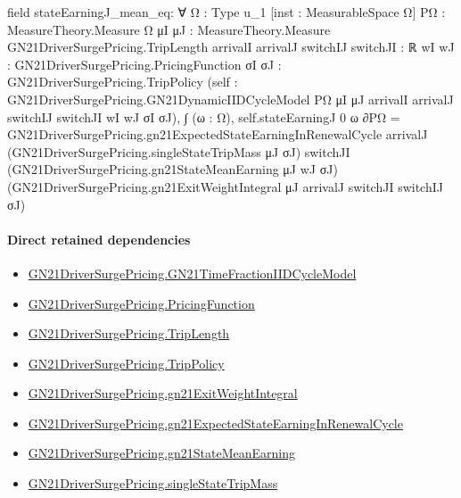 \documentclass[10pt]{article}
\begin{document}
\begin{ReviewVerbatim}
field stateEarningJ_mean_eq:
∀ {Ω : Type u_1} [inst : MeasurableSpace Ω] {PΩ : MeasureTheory.Measure Ω}
  {μI μJ : MeasureTheory.Measure GN21DriverSurgePricing.TripLength} {arrivalI arrivalJ switchIJ switchJI : ℝ}
  {wI wJ : GN21DriverSurgePricing.PricingFunction} {σI σJ : GN21DriverSurgePricing.TripPolicy}
  (self : GN21DriverSurgePricing.GN21DynamicIIDCycleModel PΩ μI μJ arrivalI arrivalJ switchIJ switchJI wI wJ σI σJ),
  ∫ (ω : Ω), self.stateEarningJ 0 ω ∂PΩ =
    GN21DriverSurgePricing.gn21ExpectedStateEarningInRenewalCycle arrivalJ
      (GN21DriverSurgePricing.singleStateTripMass μJ σJ) switchJI (GN21DriverSurgePricing.gn21StateMeanEarning μJ wJ σJ)
      (GN21DriverSurgePricing.gn21ExitWeightIntegral μJ arrivalJ switchJI switchIJ σJ)
\end{ReviewVerbatim}

\paragraph{Direct retained dependencies}
\begin{itemize}\raggedright
\item \hyperlink{paper-prerequisite-be12410503a9b0bd}{GN21\allowbreak{}Driver\allowbreak{}Surge\allowbreak{}Pricing.\allowbreak{}GN21\allowbreak{}Time\allowbreak{}Fraction\allowbreak{}IID\allowbreak{}Cycle\allowbreak{}Model}
\item \hyperlink{governing-declaration-9ab0ab344da5df05}{GN21\allowbreak{}Driver\allowbreak{}Surge\allowbreak{}Pricing.\allowbreak{}Pricing\allowbreak{}Function}
\item \hyperlink{governing-declaration-a616c143f22cf2bc}{GN21\allowbreak{}Driver\allowbreak{}Surge\allowbreak{}Pricing.\allowbreak{}Trip\allowbreak{}Length}
\item \hyperlink{governing-declaration-4312ad4cb899871f}{GN21\allowbreak{}Driver\allowbreak{}Surge\allowbreak{}Pricing.\allowbreak{}Trip\allowbreak{}Policy}
\item \hyperlink{governing-declaration-14f0a8679c69b067}{GN21\allowbreak{}Driver\allowbreak{}Surge\allowbreak{}Pricing.\allowbreak{}gn21\allowbreak{}Exit\allowbreak{}Weight\allowbreak{}Integral}
\item \hyperlink{governing-declaration-6247f5a4d65e34a2}{GN21\allowbreak{}Driver\allowbreak{}Surge\allowbreak{}Pricing.\allowbreak{}gn21\allowbreak{}Expected\allowbreak{}State\allowbreak{}Earning\allowbreak{}In\allowbreak{}Renewal\allowbreak{}Cycle}
\item \hyperlink{governing-declaration-3a25a0c77bd5a518}{GN21\allowbreak{}Driver\allowbreak{}Surge\allowbreak{}Pricing.\allowbreak{}gn21\allowbreak{}State\allowbreak{}Mean\allowbreak{}Earning}
\item \hyperlink{governing-declaration-1c88cf5996e161d3}{GN21\allowbreak{}Driver\allowbreak{}Surge\allowbreak{}Pricing.\allowbreak{}single\allowbreak{}State\allowbreak{}Trip\allowbreak{}Mass}
\end{itemize}
\end{document}
